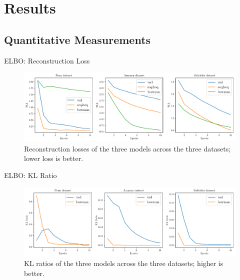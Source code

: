 \documentclass[aspectratio=169, 11pt]{beamer}
\begin{document}
  


\section{Results}

\subsection{Quantitative Measurements}
\begin{frame}{ELBO: Reconstruction Loss}
  \begin{figure}[!ht]
    \centering
    \includegraphics[width=130mm]{results/nll.pdf}
    \caption{Reconstruction losses of the three models across the three datasets; lower loss is better. \label{r:nll}}
    \end{figure}
\end{frame}

\begin{frame}{ELBO: KL Ratio}
  \begin{figure}[!ht]
    \centering
    \includegraphics[width=130mm]{results/kl_ratio.pdf}
    \caption{KL ratios of the three models across the three datasets; higher is better.\label{r:kl_ratio}}
    \end{figure}
\end{frame}
\end{document}
